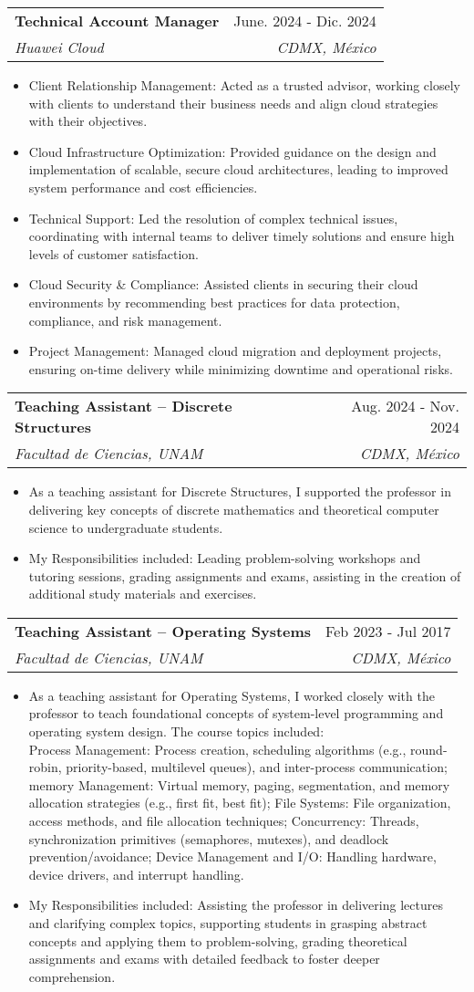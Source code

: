 \documentclass[letterpaper,11pt]{article}
\makeatletter
\newcommand{\resumeItem}[1]{
  \item\small{
    {#1 \vspace{-2pt}}
  }
}
\newcommand{\resumeSubheading}[4]{
  \vspace{-2pt}\item
    \begin{tabular*}{0.97\textwidth}[t]{l@{\extracolsep{\fill}}r}
      \textbf{#1} & #2 \\
      \textit{\small#3} & \textit{\small #4} \\
    \end{tabular*}\vspace{-7pt}
}
\newcommand{\resumeItemListStart}{\begin{itemize}}
\newcommand{\resumeItemListEnd}{\end{itemize}\vspace{-5pt}}
\makeatother
\begin{document}
    \resumeSubheading
      {Technical Account Manager}{June. 2024 - Dic. 2024}
      {Huawei Cloud}{CDMX, México}
      \resumeItemListStart
      \resumeItem{Client Relationship Management: Acted as a trusted advisor, working closely with clients to understand their business needs and align cloud strategies with their objectives.}

      \resumeItem{Cloud Infrastructure Optimization: Provided guidance on the design and implementation of scalable, secure cloud architectures, leading to improved system performance and cost efficiencies.}

      \resumeItem{Technical Support: Led the resolution of complex technical issues, coordinating with internal teams to deliver timely solutions and ensure high levels of customer satisfaction.}

        \resumeItem{Cloud Security \& Compliance: Assisted clients in securing their cloud environments by recommending best practices for data protection, compliance, and risk management.}
        
        \resumeItem{Project Management: Managed cloud migration and deployment projects, ensuring on-time delivery while minimizing downtime and operational risks.}
    \resumeItemListEnd

    \resumeSubheading
      {Teaching Assistant – Discrete Structures}{Aug. 2024 - Nov. 2024}
      {Facultad de Ciencias, UNAM}{CDMX, México}
      \resumeItemListStart
        \resumeItem{As a teaching assistant for Discrete Structures, I supported the professor in delivering key concepts of discrete mathematics and theoretical computer science to undergraduate students. }
        \resumeItem{My Responsibilities included: Leading problem-solving workshops and tutoring sessions, grading assignments and exams, assisting in the creation of additional study materials and exercises.}
      \resumeItemListEnd

      \resumeSubheading
      {Teaching Assistant – Operating Systems}{Feb 2023 - Jul 2017}
      {Facultad de Ciencias, UNAM}{CDMX, México}
      \resumeItemListStart
        \resumeItem{As a teaching assistant for Operating Systems, I worked closely with the professor to teach foundational concepts of system-level programming and operating system design. The course topics included:\\
        Process Management: Process creation, scheduling algorithms (e.g., round-robin, priority-based, multilevel queues), and inter-process communication; memory Management: Virtual memory, paging, segmentation, and memory allocation strategies (e.g., first fit, best fit); File Systems: File organization, access methods, and file allocation techniques; Concurrency: Threads, synchronization primitives (semaphores, mutexes), and deadlock prevention/avoidance; Device Management and I/O: Handling hardware, device drivers, and interrupt handling.}
        \resumeItem{My Responsibilities included: Assisting the professor in delivering lectures and clarifying complex topics, supporting students in grasping abstract concepts and applying them to problem-solving, grading theoretical assignments and exams with detailed feedback to foster deeper comprehension.}
      \resumeItemListEnd
\end{document}

